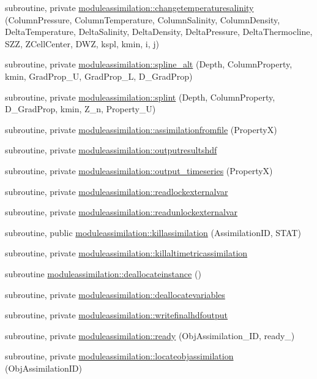 \begin{DoxyCompactItemize}
subroutine, private \mbox{\hyperlink{namespacemoduleassimilation_a689487c17f9fdb64311b351530c9244a}{moduleassimilation\+::changetemperaturesalinity}} (Column\+Pressure, Column\+Temperature, Column\+Salinity, Column\+Density, Delta\+Temperature, Delta\+Salinity, Delta\+Density, Delta\+Pressure, Delta\+Thermocline, S\+ZZ, Z\+Cell\+Center, D\+WZ, kspl, kmin, i, j)
\item 
subroutine, private \mbox{\hyperlink{namespacemoduleassimilation_a4473000cecbde1abb63d63fc9a6f5858}{moduleassimilation\+::spline\+\_\+alt}} (Depth, Column\+Property, kmin, Grad\+Prop\+\_\+U, Grad\+Prop\+\_\+L, D\+\_\+\+Grad\+Prop)
\item 
subroutine, private \mbox{\hyperlink{namespacemoduleassimilation_a5db3c59220db22267e7e1e7eca84a356}{moduleassimilation\+::splint}} (Depth, Column\+Property, D\+\_\+\+Grad\+Prop, kmin, Z\+\_\+n, Property\+\_\+U)
\item 
subroutine, private \mbox{\hyperlink{namespacemoduleassimilation_ac07092b01bbf318f77800bb88c9f12bf}{moduleassimilation\+::assimilationfromfile}} (PropertyX)
\item 
subroutine, private \mbox{\hyperlink{namespacemoduleassimilation_a48b30161fd16a556f8e54eeaf6b054e3}{moduleassimilation\+::outputresultshdf}}
\item 
subroutine, private \mbox{\hyperlink{namespacemoduleassimilation_a4802b71b408a488941f1becab34042ec}{moduleassimilation\+::output\+\_\+timeseries}} (PropertyX)
\item 
subroutine, private \mbox{\hyperlink{namespacemoduleassimilation_ad7f96fa745bdccdc0281d15675836a9b}{moduleassimilation\+::readlockexternalvar}}
\item 
subroutine, private \mbox{\hyperlink{namespacemoduleassimilation_a3215402dbc1d7602c94ca05f33ce52a7}{moduleassimilation\+::readunlockexternalvar}}
\item 
subroutine, public \mbox{\hyperlink{namespacemoduleassimilation_a3e8d98d577185433d513756aadd846f8}{moduleassimilation\+::killassimilation}} (Assimilation\+ID, S\+T\+AT)
\item 
subroutine, private \mbox{\hyperlink{namespacemoduleassimilation_a457aa90cd01b96e0e4a625d41ea9ba78}{moduleassimilation\+::killaltimetricassimilation}}
\item 
subroutine \mbox{\hyperlink{namespacemoduleassimilation_a90d72337a9f9a14b03745d53d1bb201f}{moduleassimilation\+::deallocateinstance}} ()
\item 
subroutine, private \mbox{\hyperlink{namespacemoduleassimilation_a92631d1b5885e157d6d4ef36379213e9}{moduleassimilation\+::deallocatevariables}}
\item 
subroutine, private \mbox{\hyperlink{namespacemoduleassimilation_a68cb52758df87c362f43dd3e9690121b}{moduleassimilation\+::writefinalhdfoutput}}
\item 
subroutine, private \mbox{\hyperlink{namespacemoduleassimilation_a7c7eb17646a26837c5dfb9acc963b010}{moduleassimilation\+::ready}} (Obj\+Assimilation\+\_\+\+ID, ready\+\_\+)
\item 
subroutine, private \mbox{\hyperlink{namespacemoduleassimilation_acb3e0bb143f8372bac2b99052ba4943d}{moduleassimilation\+::locateobjassimilation}} (Obj\+Assimilation\+ID)
\end{DoxyCompactItemize}
